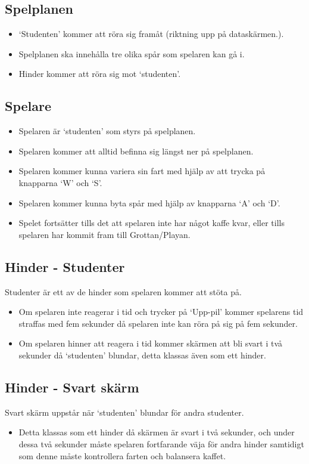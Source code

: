\documentclass{template}
\begin{document}
\subsection{Spelplanen}
\begin{itemize}
\item `Studenten' kommer att röra sig framåt (riktning upp på dataskärmen.).
\item Spelplanen ska innehålla tre olika spår som spelaren kan gå i.
\item Hinder kommer att röra sig mot `studenten'.
\end{itemize}

\subsection{Spelare}
\begin{itemize}
\item Spelaren är `studenten' som styrs på spelplanen.
\item Spelaren kommer att alltid befinna sig längst ner på spelplanen.
\item Spelaren kommer kunna variera sin fart med hjälp av att trycka på knapparna `W' och `S'.
\item Spelaren kommer kunna byta spår med hjälp av knapparna `A' och `D'.
\item Spelet fortsätter tills det att spelaren inte har något kaffe kvar, eller tills spelaren har kommit fram till Grottan/Playan.
\end{itemize}

\subsection{Hinder - Studenter}
Studenter är ett av de hinder som spelaren kommer att stöta på. 
\begin{itemize}
\item Om spelaren inte reagerar i tid och trycker på `Upp-pil' kommer spelarens tid straffas med fem sekunder då spelaren inte kan röra på sig på fem sekunder. 
\item Om spelaren hinner att reagera i tid kommer skärmen att bli svart i två sekunder då `studenten' blundar, detta klassas även som ett hinder.
\end{itemize}

\subsection{Hinder - Svart skärm}
Svart skärm uppstår när `studenten' blundar för andra studenter.
\begin{itemize}
\item Detta klassas som ett hinder då skärmen är svart i två sekunder, och under dessa två sekunder måste spelaren fortfarande väja för andra hinder samtidigt som denne måste kontrollera farten och balansera kaffet.
\end{itemize}
\end{document}
